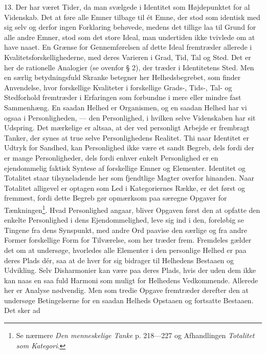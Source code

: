 \documentclass[12pt]{article}
\newcommand{\opage}[1]{\marginnote{\footnotesize\textit{[#1]}}}
\begin{document}
13. Der har været Tider, da man svælgede i Identitet som Højdepunktet
for al Videnskab. Det at føre alle Emner
\setcounter{footnote}{0}%
\opage{42}tilbage til ét Emne, der stod som identisk med sig selv og
derfor ingen Forklaring behøvede, medens det tillige laa til Grund for
alle andre Emner, stod som det store Ideal, man undertiden ikke
tvivlede om at have naaet. En Grænse for Gennemførelsen af dette Ideal
fremtræder allerede i Kvalitetsforskellighederne, med deres Varieren i
Grad, Tid, Tal og Sted. Det er her de rationelle Analogier (se ovenfor
§ 2), der træder i Identitetens Sted. Men en særlig betydningsfuld
Skranke betegner her Helhedsbegrebet, som finder Anvendelse, hvor
forskellige Kvaliteter i forskellige Grads-, Tids-, Tal- og
Stedforhold fremtræder i Erfaringen som forbundne i mere eller mindre
fast Sammenhæng. En saadan Helhed er Organismen, og en saadan Helhed
har vi ogsaa i Personligheden, --- den Personlighed, i hvilken selve
Videnskaben har sit Udspring. Det mærkelige er altsaa, at der ved
personligt Arbejde er frembragt Tanker, der synes at true selve
Personlighedens Realitet. Thi naar Identitet er Udtryk for Sandhed,
kan Personlighed ikke være et sandt Begreb, dels fordi der er mange
Personligheder, dels fordi enhver enkelt Personlighed er en
ejendommelig faktisk Syntese af forskellige Emner og Elementer.
Identitet og Totalitet staar tilsyneladende her som fjendtlige Magter
overfor hinanden. Naar Totalitet alligevel er optagen som Led i
Kategoriernes Række, er det først og fremmest, fordi dette Begreb gør
opmærksom paa særegne Opgaver for Tænkningen\footnote{Se nærmere
\textit{Den menneskelige Tanke} p. 218---227 og Afhandlingen
\textit{Totalitet som Kategori}.}. Hvad Personlighed angaar, bliver
Opgaven først den at opfatte den enkelte Personlighed i dens
Ejendommelighed, leve sig ind i den, foreløbig se Tingene fra dens
Synspunkt, med andre Ord paavise den særlige og fra andre Former
forskellige Form for Tilværelse, som
\opage{43}her træder frem. Fremdeles gælder det om at undersøge,
hvorledes alle Elementer i den personlige Helhed er paa deres Plads
dér, saa at de hver for sig bidrager til Helhedens Bestaaen og
Udvikling. Selv Disharmonier kan være paa deres Plads, hvis der uden
dem ikke kan naas en saa fuld Harmoni som muligt for Helhedens
Vedkommende. Allerede her er Analyse nødvendig. Men som tredie Opgave
fremtræder derefter den at undersøge Betingelserne for en saadan
Helheds Opstaaen og fortsatte Bestaaen. Det sker ad
\end{document}
